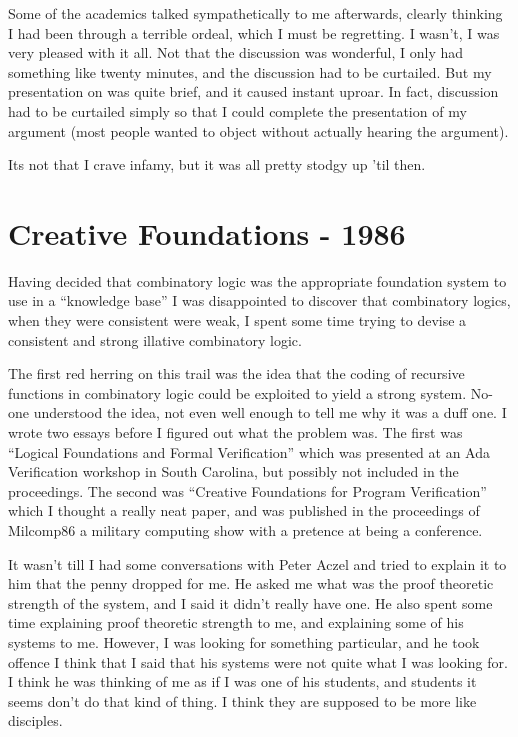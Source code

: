 \documentclass[10pt,titlepage]{book}
\begin{document}
Some of the academics talked sympathetically to me afterwards, clearly thinking I had been through a terrible ordeal, which I must be regretting.
I wasn't, I was very pleased with it all.
Not that the discussion was wonderful, I only had something like twenty minutes, and the discussion had to be curtailed.
But my presentation on was quite brief, and it caused instant uproar.
In fact, discussion had to be curtailed simply so that I could complete the presentation of my argument (most people wanted to object without actually hearing the argument).

Its not that I crave infamy, but it was all pretty stodgy up 'til then.

\section{Creative Foundations - 1986}

Having decided that combinatory logic was the appropriate foundation system to use in a ``knowledge base'' I was disappointed to discover that combinatory logics, when they were consistent were weak, I spent
some time trying to devise a consistent and strong illative combinatory logic.

The first red herring on this trail was the idea that the coding of recursive functions in combinatory logic could be exploited to yield a strong system.
No-one understood the idea, not even well enough to tell me why it was a duff one.
I wrote two essays before I figured out what the problem was.
The first was ``Logical Foundations and Formal Verification'' which was presented at an Ada Verification workshop in South Carolina, but possibly not included in the proceedings.
The second was ``Creative Foundations for Program Verification'' which I thought a really neat paper, and was published in the proceedings of Milcomp86 a military computing show with a pretence at being a conference.

It wasn't till I had some conversations with Peter Aczel and tried to explain it to him that the penny dropped for me.
He asked me what was the proof theoretic strength of the system, and I said it didn't really have one.
He also spent some time explaining proof theoretic strength to me, and explaining some of his systems to me.
However, I was looking for something particular, and he took offence I think that I said that his systems were not quite what I was looking for.
I think he was thinking of me as if I was one of his students, and students it seems don't do that kind of thing.
I think they are supposed to be more like disciples.
\end{document}
